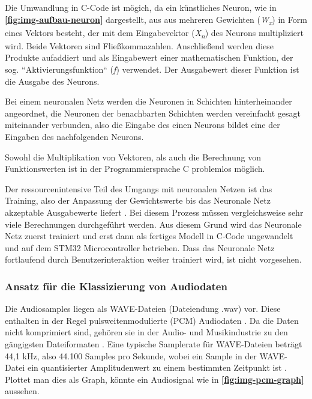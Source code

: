 Die Umwandlung in C-Code ist mögich, da ein künstliches Neuron, wie in \textbf{\autoref{fig:img-aufbau-neuron}} dargestellt, aus aus mehreren Gewichten (\textit{W\textsubscript{x}}) in Form eines Vektors besteht, der mit dem Eingabevektor (\textit{X\textsubscript{n}}) des Neurons multipliziert wird. Beide Vektoren sind Fließkommazahlen. Anschließend werden diese Produkte aufaddiert und als Eingabewert einer mathematischen Funktion, der sog. ``Aktivierungsfunktion`` (\textit{f}) verwendet. Der Ausgabewert dieser Funktion ist die Ausgabe des Neurons. \cite{neural-network-basics}

Bei einem neuronalen Netz werden die Neuronen in Schichten hinterheinander angeordnet, die Neuronen der benachbarten Schichten werden vereinfacht gesagt miteinander verbunden, also die Eingabe des einen Neurons bildet eine der Eingaben des nachfolgenden Neurons. \cite{neural-network-basics}

Sowohl die Multiplikation von Vektoren, als auch die Berechnung von Funktionswerten ist in der Programmiersprache C problemlos möglich.

Der ressourcenintensive Teil des Umgangs mit neuronalen Netzen ist das Training, also der Anpassung der Gewichtswerte bis das Neuronale Netz akzeptable Ausgabewerte liefert \cite{neural-network-basics}. Bei diesem Prozess müssen vergleichsweise sehr viele Berechnungen durchgeführt werden. Aus diesem Grund wird das Neuronale Netz zuerst trainiert und erst dann als fertiges Modell in C-Code ungewandelt und auf dem STM32 Microcontroller betrieben. 
Dass das Neuronale Netz fortlaufend durch Benutzerinteraktion weiter trainiert wird, ist nicht vorgesehen.


\subsubsection{Ansatz für die Klassizierung von Audiodaten}
\label{sec:approach-audio-classification}
Die Audiosamples liegen als WAVE-Dateien (Dateiendung .wav) vor. Diese enthalten in der Regel pulsweitenmodulierte (PCM) Audiodaten \cite{wav-contains-pcm-data}. Da die Daten nicht komprimiert sind, gehören sie in der Audio- und Musikindustrie zu den gängigsten Dateiformaten \cite{wav-popular-file-format-music-industry}. Eine typische Samplerate für WAVE-Dateien beträgt 44,1 kHz, also 44.100 Samples pro Sekunde, wobei ein Sample in der WAVE-Datei ein quantisierter Amplitudenwert zu einem bestimmten Zeitpunkt ist \cite{wav-pcm-data}. Plottet man dies als Graph, könnte ein Audiosignal wie in \textbf{\autoref{fig:img-pcm-graph}} aussehen.


